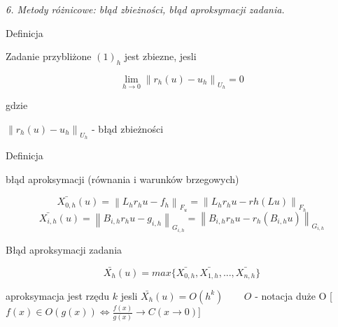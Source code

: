 \textit{6. Metody różnicowe: błąd zbieżności, błąd aproksymacji zadania.}

Definicja

Zadanie przybliżone $(1)_h$ jest zbiezne, jesli

\[ \lim_{h \rightarrow 0} \left \| r_h(u) - u_h \right \|_{U_h} = 0 \]

gdzie

$\left \| r_h(u) - u_h \right \|_{U_h}$ - błąd zbieżności

Definicja

błąd aproksymacji (równania i warunków brzegowych)

\[ \bar{X_{0,h}} (u) = \left \| L_h r_h u - f_h \right \| _{F_u} = \left \| L_hr_hu - rh(Lu) \right \| _{F_h} \]
\[ \bar{X_{i,h}} (u) = \left \| B_{i,h} r_h u - g_{i,h} \right \|_{G_{i,h}} = \left \| B_{i,h} r_h u - r_h (B_{i,h} u) \right \| _{G_{i,h}} \]

Błąd aproksymacji zadania

\[ \bar{X_h} (u) = max \{ \bar{X_{0,h}}, \bar{X_{1,h}}, ..., \bar{X_{n,h}} \} \]

aproksymacja jest rzędu $k$ jesli $\bar{X_h} (u) = O(h^k)$ $\ \ \ \ \ \ \ \ O$ - notacja duże O [$ f(x) \in O(g(x)) \Leftrightarrow \frac{f(x)}{g(x)} \rightarrow C (x \rightarrow 0)$]




